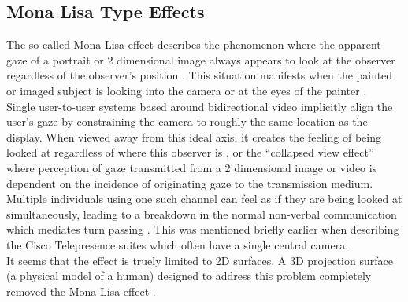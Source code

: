                    \subsection{Mona Lisa Type Effects}
            The so-called Mona Lisa effect describes the phenomenon where the apparent gaze of a portrait or 2 dimensional image always appears to look at the observer regardless of the observer's position \cite{Vishwanath2005, Anstis1969, Wollaston1824}. This situation manifests when the painted or imaged subject is looking into the camera or at the eyes of the painter \cite{Loomis2008, Fullwood2006a}.\\
Single user-to-user systems based around bidirectional video implicitly align the user's gaze by constraining the camera to roughly the same location as the display. When viewed away from this ideal axis, it creates the feeling of being looked at regardless of where this observer is \cite{AlMoubayed2012, Vishwanath2005, Anstis1969, Wollaston1824}, or the ``collapsed view effect'' \cite{Nguyen2005} where perception of gaze transmitted from a 2 dimensional image or video is dependent on the incidence of originating gaze to the transmission medium. \\
Multiple individuals using one such channel can feel as if they are being looked at simultaneously, leading to a breakdown in the normal non-verbal communication which mediates turn passing \cite{Vertegaal2002}. This was mentioned briefly earlier when describing the Cisco Telepresence suites which often have a single central camera.\\
It seems that the effect is truely limited to 2D surfaces. A 3D projection surface (a physical model of a human) designed to address this problem completely removed the Mona Lisa effect \cite{Moubayed2012}.\\
